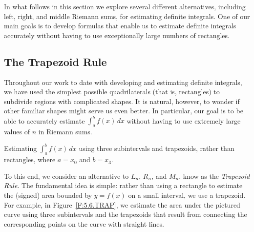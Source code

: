 In what follows in this section we explore several different alternatives, including left, right, and middle Riemann sums, for estimating definite integrals.  One of our main goals is to develop formulas that enable us to estimate definite integrals accurately without having to use exceptionally large numbers of rectangles.



\subsection*{The Trapezoid Rule} 

Throughout our work to date with developing and estimating definite integrals, we have used the simplest possible quadrilaterals (that is, rectangles) to subdivide regions with complicated shapes. It is natural, however, to wonder if other familiar shapes might serve us even better.  In particular, our goal is to be able to accurately estimate $\int_a^b f(x) \, dx$ without having to use extremely large values of $n$ in Riemann sums.

\begin{marginfigure}[2cm] %
\caption{Estimating $\int_a^b f(x) \, dx$ using three subintervals and trapezoids, rather than rectangles, where $a = x_0$ and $b = x_3$.} 
\label{F:5.6.TRAP}
\end{marginfigure}

To this end, we consider an alternative to $L_n$, $R_n$, and $M_n$, know as the \emph{Trapezoid Rule}.  The fundamental idea is simple:  rather than using a rectangle to estimate the (signed) area \newline bounded by $y = f(x)$ on a small interval, we use a trapezoid.  For example, in Figure~\ref{F:5.6.TRAP}, we estimate the area under the pictured curve using three subintervals and the trapezoids that result from connecting the corresponding points on the curve with straight lines.

